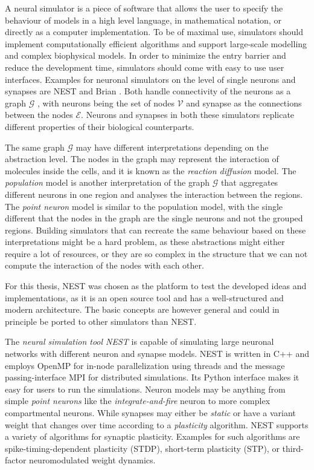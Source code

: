 A neural simulator is a piece of software that allows the user to specify the behaviour of models in a high level language, in mathematical notation, or directly as a computer implementation. To be of maximal use, simulators should implement computationally efficient algorithms and support large-scale modelling and complex biophysical models. In order to minimize the entry barrier and reduce the development time, simulators should come with easy to use user interfaces. Examples for neuronal simulators on the level of single neurons and synapses are NEST \citep{gewaltig2007nest} and Brian \citep{10.3389/neuro.11.005.2008}. Both handle connectivity of the neurons as a graph $\mathcal{G}$ \citep{bondy1976graph}, with neurons being the set of nodes $\mathcal{V}$ and synapse as the connections between the nodes $\mathcal{E}$. Neurons and synapses in both these simulators replicate different properties of their biological counterparts.

The same graph $\mathcal{G}$ may have different interpretations depending on the abstraction level. The nodes in the graph may represent the interaction of molecules inside the cells, and it is known as the \emph{reaction diffusion} model. The \emph{population} model is another interpretation of the graph $\mathcal{G}$ that aggregates different neurons in one region and analyses the interaction between the regions. The \emph{point neuron} model is similar to the population model, with the single different that the nodes in the graph are the single neurons and not the grouped regions. Building simulators that can recreate the same behaviour based on these interpretations might be a hard problem, as these abstractions might either require a lot of resources, or they are so complex in the structure that we can not compute the interaction of the nodes with each other.


For this thesis, NEST was chosen as the platform to test the developed ideas and implementations, as it is an open source tool and has a well-structured and modern architecture. The basic concepts are however general and could in principle be ported to other simulators than NEST.

The \emph{neural simulation tool NEST} \citep{gewaltig2007nest, spreizer_sebastian_2022_6368024} is capable of simulating large neuronal networks with different neuron and synapse models. NEST is written in C++ and employs OpenMP for in-node parallelization using threads and the message passing-interface MPI \citep{clarke1994mpi} for distributed simulations. Its Python interface \citep[\emph{PyNEST};][]{10.3389/neuro.11.012.2008} makes it easy for users to run the simulations. Neuron models may be anything from simple \emph{point neurons} like the \emph{integrate-and-fire} neuron to more complex compartmental neurons. While synapses may either be \emph{static} or have a variant weight that changes over time according to a \emph{plasticity} algorithm. NEST supports a variety of algorithms for synaptic plasticity. Examples for such algorithms are spike-timing-dependent plasticity (STDP), short-term plasticity (STP), or third-factor neuromodulated weight dynamics.

